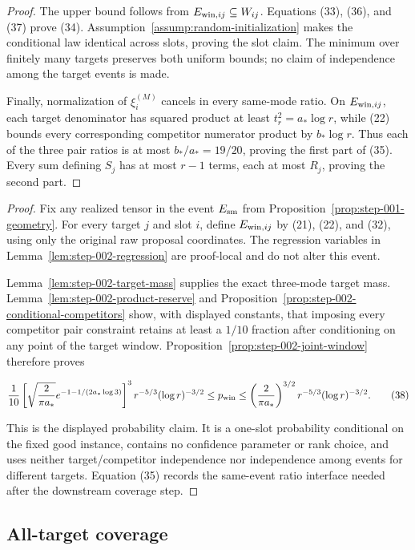 \begin{proposition}
\begin{proof}
The upper bound follows from $E_{{\rm win},ij}\subseteq W_{ij}$. Equations
(33), (36), and (37) prove (34). Assumption~\ref{assump:random-initialization}
makes the conditional law identical across slots, proving the slot claim.
The minimum over finitely many targets preserves both uniform bounds; no
claim of independence among the target events is made.

Finally, normalization of $\xi_i^{(M)}$ cancels in every same-mode ratio.
On $E_{{\rm win},ij}$, each target denominator has squared product at least
$t_r^2=a_*\log r$, while (22) bounds every corresponding competitor
numerator product by $b_*\log r$. Thus each of the three pair ratios is at
most $b_*/a_*=19/20$, proving the first part of (35). Every sum defining
$S_j$ has at most $r-1$ terms, each at most $R_j$, proving the second part.


\end{proof}
\end{proposition}
\begin{proof}
Fix any realized tensor in the event $E_{\rm sm}$ from Proposition~\ref{prop:step-001-geometry}.
For every target $j$ and slot $i$, define $E_{{\rm win},ij}$ by (21),
(22), and (32), using only the original raw proposal coordinates. The
regression variables in Lemma~\ref{lem:step-002-regression} are proof-local
and do not alter this event.

Lemma~\ref{lem:step-002-target-mass} supplies the exact three-mode target
mass. Lemma~\ref{lem:step-002-product-reserve} and
Proposition~\ref{prop:step-002-conditional-competitors} show, with displayed
constants, that imposing every competitor pair constraint retains at least a
$1/10$ fraction after conditioning on any point of the target window.
Proposition~\ref{prop:step-002-joint-window} therefore proves

\[
{1\over10}\left[\sqrt{2\over\pi a_*}
e^{-1-1/(2a_*\log3)}\right]^3
r^{-5/3}(\log r)^{-3/2}
\le p_{\rm win}
\le
\left({2\over\pi a_*}\right)^{3/2}
r^{-5/3}(\log r)^{-3/2}.
\tag{38}
\]

This is the displayed probability claim. It is a one-slot probability
conditional on the fixed good instance, contains no confidence parameter or
rank choice, and uses neither target/competitor independence nor independence
among events for different targets. Equation (35) records the same-event
ratio interface needed after the downstream coverage step.
\end{proof}

\subsection{All-target coverage}\label{app:step-003}

